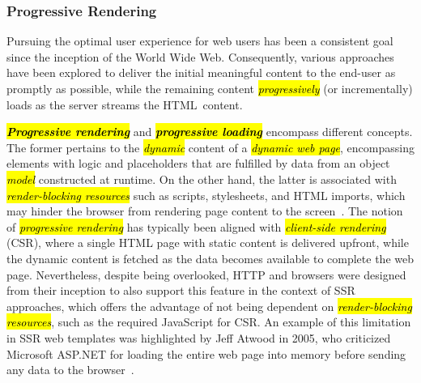\documentclass[software,article,accept,pdftex,moreauthors]{Definitions/mdpi}
\begin{document}
\subsubsection{Progressive Rendering}\label{s2.1.5}

Pursuing the optimal user experience for web users has been a consistent goal
since the inception of the World Wide Web. Consequently, various approaches
have been explored to deliver the initial meaningful content to the end-user as
promptly as possible, while the remaining content \textit{\hl{progressively}} (or
incrementally) loads as the server streams the HTML~content.

\textit{\textbf{\hl{Progressive rendering}}} and \textit{\textbf{\hl{progressive loading}}}
encompass different concepts. The former pertains to the \textit{\hl{dynamic}} content of a
\textit{\hl{dynamic web page}}, encompassing elements with logic and placeholders
that are fulfilled by data from an object \textit{\hl{model}} constructed at runtime.
On the other hand, the latter is associated with \textit{\hl{render-blocking
  resources}} such as scripts, stylesheets, and HTML imports, which may hinder the
browser from rendering page content to the screen~\cite{progressive-2022}.
The notion of \textit{\hl{progressive rendering}} has typically been aligned with
\textit{\hl{client-side rendering}} (CSR), where a single HTML page with static
content is delivered upfront, while the dynamic content is fetched as the data
becomes available to complete the web page.
Nevertheless, despite being overlooked, HTTP and browsers were designed from their
inception to also support this feature in the context of SSR approaches,
which offers the advantage of not being dependent on
\textit{\hl{render-blocking resources}}, such as the required JavaScript for CSR.
An example of this limitation in SSR web templates was highlighted by Jeff
Atwood in 2005, who criticized Microsoft ASP.NET for loading the entire web
page into memory before sending any data to the browser~\cite{pssr2005}.
\end{document}
